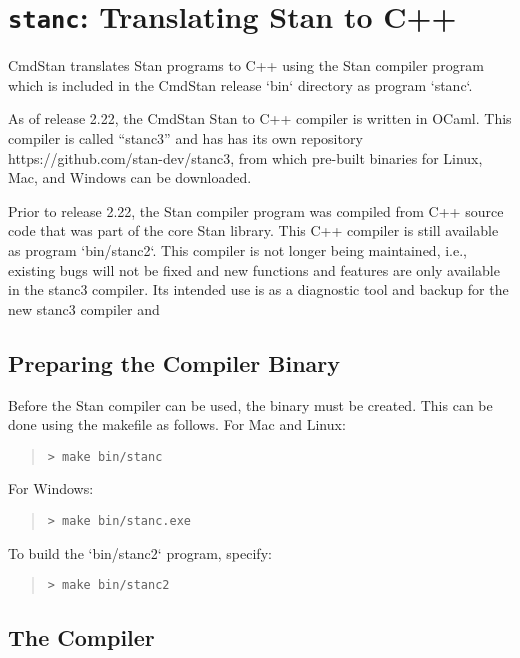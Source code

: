 \chapter{{\tt\bfseries stanc}: Translating Stan to C++}\label{stanc.chapter}


CmdStan  translates Stan programs to C++ using the Stan compiler program which
is included in the CmdStan release `bin` directory as program `stanc`.

As of release 2.22, the CmdStan Stan to C++ compiler is 
written in OCaml.
This compiler is called ``stanc3'' and has has its own repository
https://github.com/stan-dev/stanc3, from which pre-built binaries
for Linux, Mac, and Windows can be downloaded.

Prior to release 2.22, the Stan compiler program was compiled from C++ source code
that was part of the core Stan library.
This C++ compiler is still available as program `bin/stanc2`.
This compiler is not longer being maintained, i.e., existing bugs will not be fixed
and new functions and features are only available in the stanc3 compiler.
Its intended use is as a diagnostic tool and backup for the new stanc3 compiler and

\section{Preparing the \stanc Compiler Binary}

Before the Stan compiler can be used, the binary \stanc must be created.
This can be done using the makefile as follows. For Mac and Linux:
%
\begin{quote}
\begin{Verbatim}[fontshape=sl]
> make bin/stanc
\end{Verbatim}
\end{quote}
%
For Windows:
%
\begin{quote}
\begin{Verbatim}[fontshape=sl]
> make bin/stanc.exe
\end{Verbatim}
\end{quote}
%
To build the `bin/stanc2` program,  specify:
%
\begin{quote}
\begin{Verbatim}[fontshape=sl]
> make bin/stanc2
\end{Verbatim}
\end{quote}
%


\section{The \stanc Compiler}

